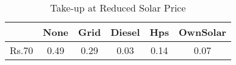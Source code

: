 \begin{table}[htbp]\centering
\caption{Take-up at Reduced Solar Price}
\begin{tabular}{l*{5}{c}}
\toprule
            &        None&        Grid&      Diesel&         Hps&    OwnSolar\\
\midrule
Rs.70       &        0.49&        0.29&        0.03&        0.14&        0.07\\
\bottomrule
\end{tabular}
\end{table}
